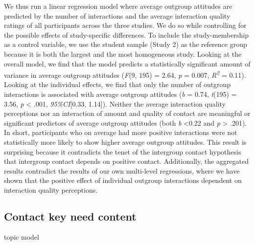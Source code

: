 We thus run a linear regression model where average outgroup attitudes
are predicted by the number of interactions and the average interaction
quality ratings of all participants across the three studies. We do so
while controlling for the possible effects of study-specific
differences. To include the study-membership as a control variable, we
use the student sample (Study 2) as the reference group because it is
both the largest and the most homogeneous study. Looking at the overall
model, we find that the model predicts a statistically significant
amount of variance in average outgroup attitudes (\textit{F}(9, 195) =
2.64, \textit{p} = 0.007, \textit{R\textsuperscript{2}} = 0.11). Looking
at the individual effects, we find that only the number of outgroup
interactions is associated with average outgroup attitudes (\textit{b} =
0.74, \textit{t}(195) = 3.56, \textit{p} \textless{} .001,
\textit{95\%CI}{[}0.33, 1.14{]}). Neither the average interaction
quality perceptions nor an interaction of amount and quality of contact
are meaningful or significant predictors of average outgroup attitudes
(both \textit{b} \textless0.22 and \textit{p} \textgreater{} .201). In
short, participants who on average had more positive interactions were
not statistically more likely to show higher average outgroup attitudes.
This result is surprising because it contradicts the tenet of the
intergroup contact hypothesis that intergroup contact depends on
positive contact. Additionally, the aggregated results contradict the
results of our own multi-level regressions, where we have shown that the
positive effect of individual outgroup interactions dependent on
interaction quality perceptions.

\subsection{Contact key need content}

topic model
